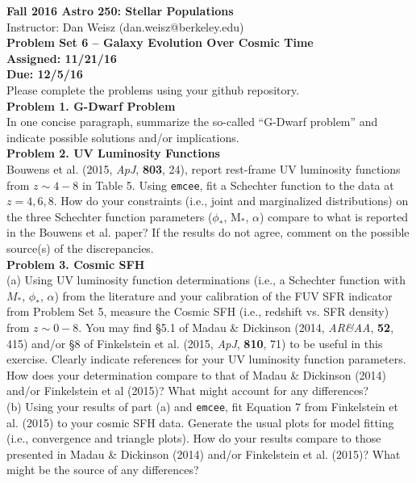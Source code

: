 \documentclass{article}
\begin{document}
\noindent \textbf{\large{Fall 2016 Astro 250: Stellar Populations}} \\
\noindent Instructor: Dan Weisz (dan.weisz@berkeley.edu) \\
\textbf{\large{Problem Set 6 -- Galaxy Evolution Over Cosmic Time}} \\
\textbf{{Assigned: 11/21/16}} \\
\textbf{{Due: 12/5/16}} \\

Please complete the problems using your github repository. \\

\noindent \textbf{Problem 1. G-Dwarf Problem} \\

In one concise paragraph, summarize the so-called ``G-Dwarf problem'' and indicate possible solutions and/or implications. \\

\noindent \textbf{Problem 2. UV Luminosity Functions} \\

Bouwens et al. (2015, \textit{ApJ}, \textbf{803}, 24), report rest-frame UV luminosity functions from $z\sim4-8$ in Table 5.  Using \texttt{emcee}, fit a Schechter function to the data at $z=4,6,8$.  How do your constraints (i.e., joint and marginalized distributions) on the three Schechter function parameters ($\phi_{*}$, M$_{*}$, $\alpha$) compare to what is reported in the Bouwens et al. paper?  If the results do not agree, comment on the possible source(s) of the discrepancies.\\

\noindent \textbf{Problem 3. Cosmic SFH} \\

(a) Using UV luminosity function determinations (i.e., a Schechter function with $M_{*}$, $\phi_*$, $\alpha$) from the literature and your calibration of the FUV SFR indicator from Problem Set 5, measure the Cosmic SFH (i.e., redshift vs. SFR density) from $z\sim0-8$.  You may find \S 5.1 of Madau \& Dickinson (2014, \textit{AR\&AA}, \textbf{52}, 415) and/or \S 8 of Finkelstein et al. (2015, \textit{ApJ}, \textbf{810}, 71) to be useful in this exercise. Clearly indicate references for your UV luminosity function parameters. How does your determination compare to that of Madau \& Dickinson (2014) and/or Finkelstein et al (2015)?  What might account for any differences? \\

(b) Using your results of part (a) and \texttt{emcee}, fit Equation 7 from Finkelstein et al. (2015) to your cosmic SFH data.  Generate the usual plots for model fitting (i.e., convergence and triangle plots).  How do your results compare to those presented in Madau \& Dickinson (2014) and/or Finkelstein et al. (2015)?  What might be the source of any differences?
\end{document}

